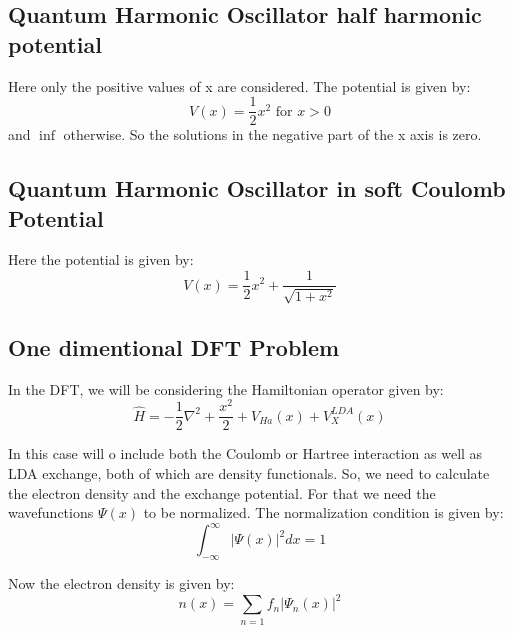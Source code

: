 \documentclass{article}
\begin{document}
\begin{multicols}{2}
\subsection{\label{QHOHP}Quantum Harmonic Oscillator half harmonic potential}

Here only the positive values of x are considered. The potential is given by:
\begin{equation}
    V(x) = \frac{1}{2}x^2 \text{ for } x > 0
\end{equation}
and $\inf$ otherwise.
So the solutions in the negative part of the x axis is zero.




\subsection{\label{QHOSC}Quantum Harmonic Oscillator in soft Coulomb Potential}

Here the potential is given by:
\begin{equation}
    V(x) = \frac{1}{2}x^2 + \frac{1}{\sqrt{1+x^2}}
\end{equation}







\subsection{\label{DFT}One dimentional DFT Problem}

In the DFT, we will be considering the Hamiltonian operator given by:
\begin{equation}
    \hat{H} = -\frac{1}{2}\nabla^2 + \frac{x^2}{2}  + V_{Ha}(x) + V_{X}^{LDA} (x)
\end{equation}

In this case will o include both the Coulomb or Hartree interaction as well as LDA exchange, both of which are density functionals. So, we need to calculate the electron density and the exchange potential. For that we need the wavefunctions $\Psi (x)$ to be normalized. The normalization condition is given by:
\begin{equation}
    \int_{-\infty}^{\infty} |\Psi(x)|^2 dx = 1
\end{equation}

Now the electron density is given by:
\begin{equation}
    n(x) = \sum_{n=1} f_n |\Psi_n(x)|^2
\end{equation}


\end{multicols}
\end{document}

